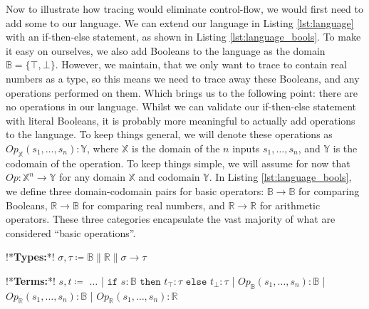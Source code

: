        Now to illustrate how tracing would eliminate control-flow, we would first need to add some to our language.
        We can extend our language in Listing \ref{lst:language} with an if-then-else statement, as shown in Listing \ref{lst:language_bools}.
        To make it easy on ourselves, we also add Booleans to the language as the domain $\mathbb{B}=\{\top,\bot\}$.
        However, we maintain, that we only want to trace to contain real numbers as a type, so this means we need to trace away these Booleans, and any operations performed on them.
        Which brings us to the following point: there are no operations in our language.
        Whilst we can validate our if-then-else statement with literal Booleans, it is probably more meaningful to actually add operations to the language.
        To keep things general, we will denote these operations as $Op_\mathbb{X}(s_1,\dots,s_n):\mathbb{Y}$, where $\mathbb{X}$ is the domain of the $n$ inputs $s_1,\dots,s_n$, and $\mathbb{Y}$ is the codomain of the operation.
        To keep things simple, we will assume for now that $Op:\mathbb{X}^n\to\mathbb{Y}$ for any domain $\mathbb{X}$ and codomain $\mathbb{Y}$.
        In Listing \ref{lst:language_bools}, we define three domain-codomain pairs for basic operators: $\mathbb{B}\to\mathbb{B}$ for comparing Booleans, $\mathbb{R}\to\mathbb{B}$ for comparing real numbers, and $\mathbb{R}\to\mathbb{R}$ for arithmetic operators.
        These three categories encapsulate the vast majority of what are considered ``basic operations''.

        \begin{quicklst}[caption=Booleans and operations in the language, label=lst:language_bools, gobble=12]
            !*\textbf{Types:}*!
                $\sigma,\tau\coloneqq\mathbb{B}\|\mathbb{R}\|\sigma\to\tau$

            !*\textbf{Terms:}*!
                $s,t\coloneqq$
                    $\dots$
                  | $\texttt{if }s:\mathbb{B}\texttt{ then }t_\top:\tau\texttt{ else }t_\bot:\tau$
                  | $Op_\mathbb{B}(s_1,\dots,s_n):\mathbb{B}$
                  | $Op_\mathbb{R}(s_1,\dots,s_n):\mathbb{B}$
                  | $Op_\mathbb{R}(s_1,\dots,s_n):\mathbb{R}$
        \end{quicklst}

